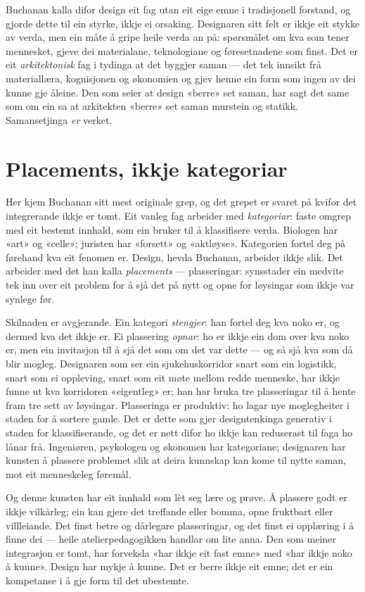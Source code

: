 Buchanan kalla difor design eit fag utan eit eige emne i tradisjonell forstand, og gjorde dette til ein styrke, ikkje ei orsaking. Designaren sitt felt er ikkje eit stykke av verda, men ein måte å gripe heile verda an på: spørsmålet om kva som tener mennesket, gjeve dei materialane, teknologiane og føresetnadene som finst. Det er eit \emph{arkitektonisk} fag i tydinga at det byggjer saman — det tek innsikt frå materiallæra, kognisjonen og økonomien og gjev henne ein form som ingen av dei kunne gje åleine. Den som seier at design «berre» set saman, har sagt det same som om ein sa at arkitekten «berre» set saman murstein og statikk. Samansetjinga \emph{er} verket.

\section{Placements, ikkje kategoriar}

Her kjem Buchanan sitt mest originale grep, og det grepet er svaret på kvifor det integrerande ikkje er tomt. Eit vanleg fag arbeider med \emph{kategoriar}: faste omgrep med eit bestemt innhald, som ein bruker til å klassifisere verda. Biologen har «art» og «celle»; juristen har «forsett» og «aktløyse». Kategorien fortel deg på førehand kva eit fenomen er. Design, hevda Buchanan, arbeider ikkje slik. Det arbeider med det han kalla \emph{placements} — plasseringar: synsstader ein medvite tek inn over eit problem for å sjå det på nytt og opne for løysingar som ikkje var synlege før.

Skilnaden er avgjerande. Ein kategori \emph{stengjer}: han fortel deg kva noko er, og dermed kva det ikkje er. Ei plassering \emph{opnar}: ho er ikkje ein dom over kva noko er, men ein invitasjon til å sjå det som om det var dette — og så sjå kva som då blir mogleg. Designaren som ser ein sjukehuskorridor snart som ein logistikk, snart som ei oppleving, snart som eit møte mellom redde menneske, har ikkje funne ut kva korridoren «eigentleg» er; han har bruka tre plasseringar til å hente fram tre sett av løysingar. Plasseringa er produktiv: ho lagar nye moglegheiter i staden for å sortere gamle. Det er dette som gjer designtenkinga generativ i staden for klassifiserande, og det er nett difor ho ikkje kan reduserast til faga ho lånar frå. Ingeniøren, psykologen og økonomen har kategoriane; designaren har kunsten å plassere problemet slik at deira kunnskap kan kome til nytte saman, mot eit menneskeleg føremål.

Og denne kunsten har eit innhald som lèt seg lære og prøve. Å plassere godt er ikkje vilkårleg; ein kan gjere det treffande eller bomma, opne fruktbart eller villleiande. Det finst betre og dårlegare plasseringar, og det finst ei opplæring i å finne dei — heile atelierpedagogikken handlar om lite anna. Den som meiner integrasjon er tomt, har forveksla «har ikkje eit fast emne» med «har ikkje noko å kunne». Design har mykje å kunne. Det er berre ikkje eit emne; det er ein kompetanse i å gje form til det ubestemte.


